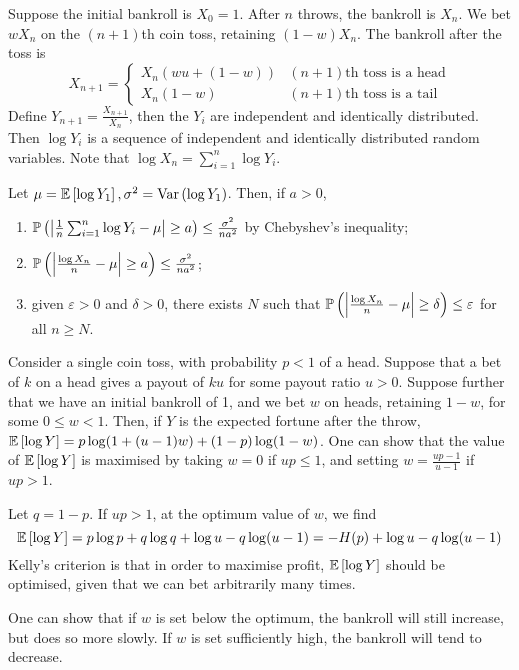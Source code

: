 Suppose the initial bankroll is \( X_0 = 1 \).
After \( n \) throws, the bankroll is \( X_n \).
We bet \( w X_n \) on the \( (n + 1) \)th coin toss, retaining \( (1-w)X_n \).
The bankroll after the toss is
\[ X_{n+1} = \begin{cases}
    X_n(wu + (1-w)) & (n + 1)\text{th toss is a head} \\
    X_n(1-w) & (n + 1)\text{th toss is a tail}
\end{cases} \]
Define \( Y_{n+1} = \frac{X_{n+1}}{X_n} \), then the \( Y_i \) are independent and identically distributed.
Then \( \log Y_i \) is a sequence of independent and identically distributed random variables.
Note that \( \log X_n = \sum_{i=1}^n \log Y_i \).
\begin{lemma}
    Let \( \mu = \mathbb{E}\left[{\log Y_1}\right], \sigma^2 = \operatorname{Var}\left({\log Y_1}\right) \).
    Then, if \( a > 0 \),
    \begin{enumerate}
        \item \( \mathbb{P}\left({\abs{\frac{1}{n} \sum_{i=1}^n \log Y_i - \mu} \geq a}\right) \leq \frac{\sigma^2}{na^2} \) by Chebyshev's inequality;
        \item \( \mathbb{P}\left({\abs{\frac{\log X_n}{n} - \mu} \geq a}\right) \leq \frac{\sigma^2}{na^2} \);
        \item given \( \varepsilon > 0 \) and \( \delta > 0 \), there exists \( N \) such that \( \mathbb{P}\left({\abs{\frac{\log X_n}{n} - \mu} \geq \delta}\right) \leq \varepsilon \) for all \( n \geq N \).
    \end{enumerate}
\end{lemma}
Consider a single coin toss, with probability \( p < 1 \) of a head.
Suppose that a bet of \( k \) on a head gives a payout of \( ku \) for some payout ratio \( u > 0 \).
Suppose further that we have an initial bankroll of 1, and we bet \( w \) on heads, retaining \( 1 - w \), for some \( 0 \leq w < 1 \).
Then, if \( Y \) is the expected fortune after the throw, \( \mathbb{E}\left[{\log Y}\right] = p \log(1 + (u-1)w) + (1-p) \log(1-w) \).
One can show that the value of \( \mathbb{E}\left[{\log Y}\right] \) is maximised by taking \( w = 0 \) if \( up \leq 1 \), and setting \( w = \frac{up-1}{u-1} \) if \( up > 1 \).

Let \( q = 1-p \).
If \( up > 1 \), at the optimum value of \( w \), we find
\[ \mathbb{E}\left[{\log Y}\right] = p \log p + q \log q + \log u - q \log(u-1) = -H(p) + \log u - q \log(u-1) \]
Kelly's criterion is that in order to maximise profit, \( \mathbb{E}\left[{\log Y}\right] \) should be optimised, given that we can bet arbitrarily many times.

One can show that if \( w \) is set below the optimum, the bankroll will still increase, but does so more slowly.
If \( w \) is set sufficiently high, the bankroll will tend to decrease.
